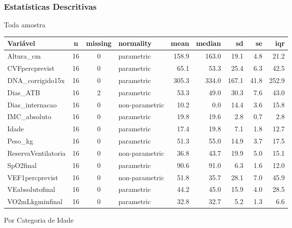 \documentclass[
]{article}
\begin{document}
\hypertarget{estatuxedsticas-descritivas-1}{%
\subsubsection{Estatísticas
Descritivas}\label{estatuxedsticas-descritivas-1}}

Toda amostra

\begin{tabular}{l|c|c|l|r|r|r|r|r}
\hline
Variável & n & missing & normality & mean & median & sd & se & iqr\\
\hline
Altura\_cm & 16 & 0 & parametric & 158.9 & 163.0 & 19.1 & 4.8 & 21.2\\
\hline
CVFpercprevist & 16 & 0 & parametric & 65.1 & 53.3 & 25.4 & 6.3 & 42.5\\
\hline
DNA\_corrigido15x & 16 & 0 & parametric & 305.3 & 334.0 & 167.1 & 41.8 & 252.9\\
\hline
Dias\_ATB & 16 & 2 & parametric & 53.3 & 49.0 & 30.3 & 7.6 & 43.0\\
\hline
Dias\_internacao & 16 & 0 & non-parametric & 10.2 & 0.0 & 14.4 & 3.6 & 15.8\\
\hline
IMC\_absoluto & 16 & 0 & parametric & 19.8 & 19.6 & 2.8 & 0.7 & 2.8\\
\hline
Idade & 16 & 0 & parametric & 17.4 & 19.8 & 7.1 & 1.8 & 12.7\\
\hline
Peso\_kg & 16 & 0 & parametric & 51.3 & 55.0 & 14.9 & 3.7 & 17.5\\
\hline
ReservaVentilatoria & 16 & 0 & non-parametric & 36.8 & 43.7 & 19.9 & 5.0 & 15.1\\
\hline
SpO2final & 16 & 0 & parametric & 90.6 & 91.0 & 6.3 & 1.6 & 12.0\\
\hline
VEF1percprevist & 16 & 0 & non-parametric & 51.8 & 35.7 & 28.1 & 7.0 & 45.9\\
\hline
VEabsolutofinal & 16 & 0 & parametric & 44.2 & 45.0 & 15.9 & 4.0 & 28.5\\
\hline
VO2mLkgminfinal & 16 & 0 & parametric & 32.8 & 32.7 & 5.2 & 1.3 & 6.6\\
\hline
\end{tabular}

Por Categoria de Idade
\end{document}
